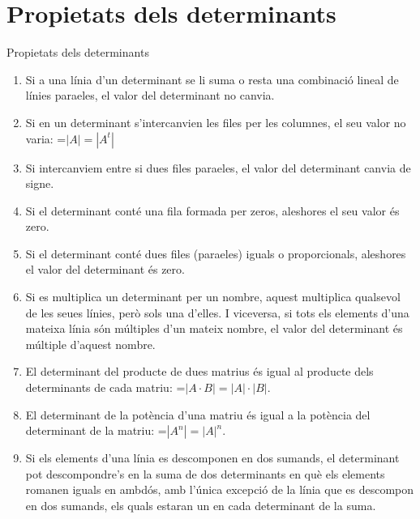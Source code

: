\documentclass[11pt,a4paper]{article}
\newcommand{\fmm}[1]{\setbox0=\hbox{$#1$}\ifdim\wd0>\linewidth\fmdisp{#1}\else\mbox{\box0}\fi}
\newcommand{\fmdisp}[1]{\[\setbox2=\hbox{$\displaystyle #1$}\ifdim\wd2>\linewidth\resizebox{\linewidth}{!}{\box2}\else\box2\fi\]}
\begin{document}
\section{Propietats dels determinants}\hypertarget{sec4}{}

\begin{fmprop}{Propietats dels determinants}
\begin{enumerate}
\item Si a una línia d'un determinant se li suma o resta una combinació lineal de línies para\lgem{}eles, el valor del determinant no canvia.
\item Si en un determinant s'intercanvien les files per les columnes, el seu valor no varia: \fmm{|A|=|A^t|}
\item Si intercanviem entre si dues files para\lgem{}eles, el valor del determinant canvia de signe.
\item Si el determinant conté una fila formada per zeros, aleshores el seu valor és zero.
\item Si el determinant conté dues files (para\lgem{}eles) iguals o proporcionals, aleshores el valor del determinant és zero.
\item Si es multiplica un determinant per un nombre, aquest multiplica qualsevol de les seues línies, però sols una d'elles. I viceversa, si tots els elements d'una mateixa línia són múltiples d'un mateix nombre, el valor del determinant és múltiple d'aquest nombre.
\item El determinant del producte de dues matrius és igual al producte dels determinants de cada matriu: \fmm{|A\cdot B|=|A|\cdot|B|}.
\item El determinant de la potència d'una matriu és igual a la potència del determinant de la matriu: \fmm{|A^n|=|A|^n}.
\item Si els elements d'una línia es descomponen en dos sumands, el determinant pot descompondre's en la suma de dos determinants en què els elements romanen iguals en ambdós, amb l'única excepció de la línia que es descompon en dos sumands, els quals estaran un en cada determinant de la suma.
\end{enumerate}
\end{fmprop}
\end{document}
